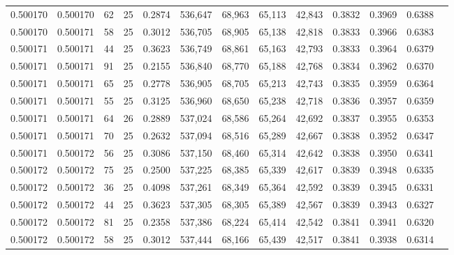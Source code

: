 \begin{tabular}{rrrrrrrrrrrrr}
0.500170 & 0.500170 &    62 &  25 &                                     0.2874 & 536,647 &  68,963 &  65,113 &  42,843 & 0.3832 & 0.3969 & 0.6388 \\
0.500170 & 0.500171 &    58 &  25 &                                     0.3012 & 536,705 &  68,905 &  65,138 &  42,818 & 0.3833 & 0.3966 & 0.6383 \\
0.500171 & 0.500171 &    44 &  25 &                                     0.3623 & 536,749 &  68,861 &  65,163 &  42,793 & 0.3833 & 0.3964 & 0.6379 \\
0.500171 & 0.500171 &    91 &  25 &                                     0.2155 & 536,840 &  68,770 &  65,188 &  42,768 & 0.3834 & 0.3962 & 0.6370 \\
0.500171 & 0.500171 &    65 &  25 &                                     0.2778 & 536,905 &  68,705 &  65,213 &  42,743 & 0.3835 & 0.3959 & 0.6364 \\
0.500171 & 0.500171 &    55 &  25 &                                     0.3125 & 536,960 &  68,650 &  65,238 &  42,718 & 0.3836 & 0.3957 & 0.6359 \\
0.500171 & 0.500171 &    64 &  26 &                                     0.2889 & 537,024 &  68,586 &  65,264 &  42,692 & 0.3837 & 0.3955 & 0.6353 \\
0.500171 & 0.500171 &    70 &  25 &                                     0.2632 & 537,094 &  68,516 &  65,289 &  42,667 & 0.3838 & 0.3952 & 0.6347 \\
0.500171 & 0.500172 &    56 &  25 &                                     0.3086 & 537,150 &  68,460 &  65,314 &  42,642 & 0.3838 & 0.3950 & 0.6341 \\
0.500172 & 0.500172 &    75 &  25 &                                     0.2500 & 537,225 &  68,385 &  65,339 &  42,617 & 0.3839 & 0.3948 & 0.6335 \\
0.500172 & 0.500172 &    36 &  25 &                                     0.4098 & 537,261 &  68,349 &  65,364 &  42,592 & 0.3839 & 0.3945 & 0.6331 \\
0.500172 & 0.500172 &    44 &  25 &                                     0.3623 & 537,305 &  68,305 &  65,389 &  42,567 & 0.3839 & 0.3943 & 0.6327 \\
0.500172 & 0.500172 &    81 &  25 &                                     0.2358 & 537,386 &  68,224 &  65,414 &  42,542 & 0.3841 & 0.3941 & 0.6320 \\
0.500172 & 0.500172 &    58 &  25 &                                     0.3012 & 537,444 &  68,166 &  65,439 &  42,517 & 0.3841 & 0.3938 & 0.6314 \\

\end{tabular}
